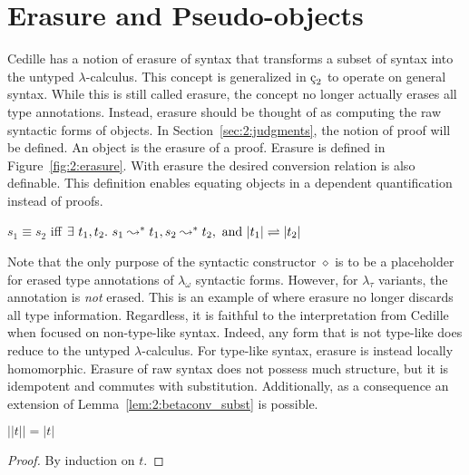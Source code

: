 \section{Erasure and Pseudo-objects}
\label{sec:2:erasure}

Cedille has a notion of erasure of syntax that transforms a subset of syntax into the untyped $\lambda$-calculus.
This concept is generalized in $\ced$ to operate on general syntax.
While this is still called erasure, the concept no longer actually erases all type annotations.
Instead, erasure should be thought of as computing the raw syntactic forms of objects.
In Section~\ref{sec:2:judgments}, the notion of proof will be defined.
An object is the erasure of a proof.
Erasure is defined in Figure~\ref{fig:2:erasure}.
With erasure the desired conversion relation is also definable.
This definition enables equating objects in a dependent quantification instead of proofs.

\begin{definition}
    \label{def:2:conv}
    $s_1 \equiv s_2$ iff $\exists\ t_1, t_2.\ s_1 \leadsto^* t_1, s_2 \leadsto^* t_2, \text{ and } |t_1| \rightleftharpoons |t_2|$
\end{definition}



Note that the only purpose of the syntactic constructor $\diamond$ is to be a placeholder for erased type annotations of $\lambda_\omega$ syntactic forms.
However, for $\lambda_\tau$ variants, the annotation is \textit{not} erased.
This is an example of where erasure no longer discards all type information.
Regardless, it is faithful to the interpretation from Cedille when focused on non-type-like syntax.
Indeed, any form that is not type-like does reduce to the untyped $\lambda$-calculus.
For type-like syntax, erasure is instead locally homomorphic.
Erasure of raw syntax does not possess much structure, but it is idempotent and commutes with substitution.
Additionally, as a consequence an extension of Lemma~\ref{lem:2:betaconv_subst} is possible.

\begin{lemma}
    \label{lem:2:erasure_idempotent}
    $||t|| = |t|$
\end{lemma}
\begin{proof}
    By induction on $t$.
\end{proof}

